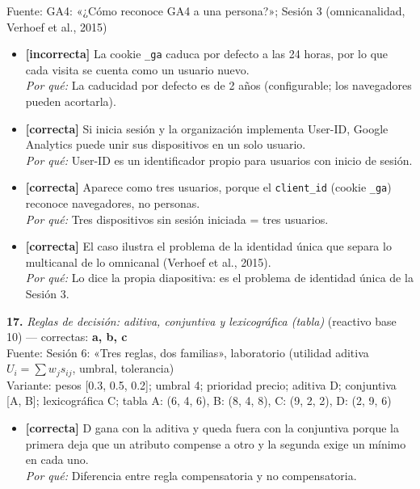 \documentclass[10pt,letterpaper]{article}
\begin{document}
{{\scriptsize Fuente: GA4: «¿Cómo reconoce GA4 a una persona?»; Sesión 3 (omnicanalidad, Verhoef et al., 2015)}
\begin{itemize}[leftmargin=1.2em,itemsep=0pt,topsep=1pt,parsep=0pt]
\item[\textbf{a)}] {\footnotesize \textbf{[incorrecta]} La cookie \texttt{\_ga} caduca por defecto a las 24 horas, por lo que cada visita se cuenta como un usuario nuevo.\\ \textit{Por qué:} La caducidad por defecto es de 2 años (configurable; los navegadores pueden acortarla).}
\item[\textbf{b)}] {\footnotesize \textbf{[correcta]} Si inicia sesión y la organización implementa User-ID, Google Analytics puede unir sus dispositivos en un solo usuario.\\ \textit{Por qué:} User-ID es un identificador propio para usuarios con inicio de sesión.}
\item[\textbf{c)}] {\footnotesize \textbf{[correcta]} Aparece como tres usuarios, porque el \texttt{client\_id} (cookie \texttt{\_ga}) reconoce navegadores, no personas.\\ \textit{Por qué:} Tres dispositivos sin sesión iniciada = tres usuarios.}
\item[\textbf{d)}] {\footnotesize \textbf{[correcta]} El caso ilustra el problema de la identidad única que separa lo multicanal de lo omnicanal (Verhoef et al., 2015).\\ \textit{Por qué:} Lo dice la propia diapositiva: es el problema de identidad única de la Sesión 3.}
\end{itemize}
\vspace{3pt}\noindent\textbf{17.} \textit{Reglas de decisión: aditiva, conjuntiva y lexicográfica (tabla)} (reactivo base 10) — correctas: \textbf{a, b, c}\\[-1pt]
{\scriptsize Fuente: Sesión 6: «Tres reglas, dos familias», laboratorio (utilidad aditiva $U_i=\sum w_j s_{ij}$, umbral, tolerancia)}
\\{\scriptsize Variante: pesos [0.3, 0.5, 0.2]; umbral 4; prioridad precio; aditiva D; conjuntiva [A, B]; lexicográfica C; tabla A: (6, 4, 6), B: (8, 4, 8), C: (9, 2, 2), D: (2, 9, 6)}
\begin{itemize}[leftmargin=1.2em,itemsep=0pt,topsep=1pt,parsep=0pt]
\item[\textbf{a)}] {\footnotesize \textbf{[correcta]} D gana con la aditiva y queda fuera con la conjuntiva porque la primera deja que un atributo compense a otro y la segunda exige un mínimo en cada uno.\\ \textit{Por qué:} Diferencia entre regla compensatoria y no compensatoria.}

\end{itemize}}
\end{document}
